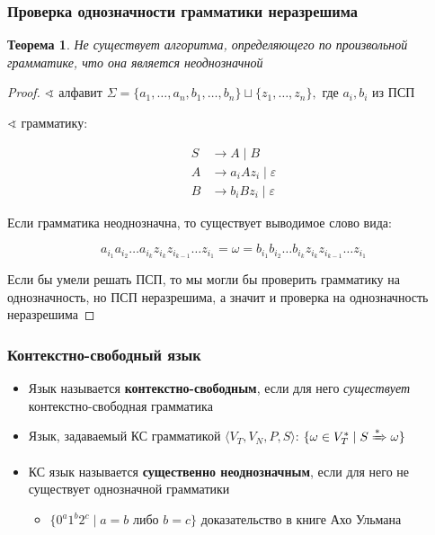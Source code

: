 \documentclass{beamer}
\newtheorem{rutheorem}{Теорема}
\newcommand{\derives}[1][*]{\xRightarrow[]{#1}}
\begin{document}
\begin{frame}[fragile]
  \transwipe[direction=90]
  \frametitle{Проверка однозначности грамматики неразрешима}

\begin{rutheorem}
  Не существует алгоритма, определяющего по произвольной грамматике, что она является неоднозначной
\end{rutheorem}

\begin{proof}
  $\sphericalangle \text{ алфавит } \Sigma = \{a_1, \dots, a_n, b_1, \dots, b_n\} \sqcup \{z_1, \dots, z_n\}, \text{ где } a_i, b_i \text{ из ПСП }$

  $\sphericalangle$ грамматику:

\vspace{-1.2cm}

  \begin{align*}
    S &\to A \mid B \\
    A &\to a_i A z_i \mid \varepsilon \\
    B &\to b_i B z_i \mid \varepsilon
  \end{align*}

  \vspace{-0.35cm}

  Если грамматика неоднозначна, то существует выводимое слово вида:

  \vspace{-0.5cm}
  \[a_{i_1} a_{i_2} \dots a_{i_k} z_{i_k} z_{i_{k-1}} \dots z_{i_1} = \omega = b_{i_1} b_{i_2} \dots b_{i_k} z_{i_k} z_{i_{k-1}} \dots z_{i_1}\]

  Если бы умели решать ПСП, то мы могли бы проверить грамматику на однозначность, но ПСП неразрешима, а значит и проверка на однозначность неразрешима
\end{proof}

\end{frame}


\begin{frame}[fragile]
  \transwipe[direction=90]
  \frametitle{Контекстно-свободный язык}
  \begin{itemize}
    \item Язык называется \textbf{контекстно-свободным}, если для него \emph{существует} контекстно-свободная грамматика
    \item Язык, задаваемый КС грамматикой $\langle V_T, V_N, P, S\rangle$: $\{ \omega \in V_T^* \mid S \derives \omega \}$
    \item КС язык называется \textbf{существенно неоднозначным}, если для него не существует однозначной грамматики
    \begin{itemize}
      \item $\{0^a 1^b 2^c \mid a = b \text{ либо } b = c \}$ \hfill доказательство в книге Ахо Ульмана
    \end{itemize}
  \end{itemize}
\end{frame}
\end{document}
